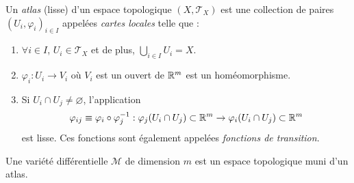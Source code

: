 \begin{theoremframe}
    \begin{defi}
        Un \textit{atlas} (lisse) d'un espace topologique $(X,\mathcal{T}_X)$ est une collection de paires $(U_i,\varphi_i)_{i\in I}$ appelées \emph{cartes locales} telle que :
        \begin{enumerate}[label=\roman*.]
            \item $\forall i\in I$, $U_i \in \mathcal{T}_X$ et de plus, $\bigcup_{i\in I} U_i = X$.
            \item $\varphi_i:U_i\to V_i$ où $V_i$ est un ouvert de $\mathbb{R}^m$ est un homéomorphisme.
            \item Si $U_i \cap U_j \neq \varnothing$, l'application 
            \begin{align}
                \varphi_{ij} \equiv \varphi_i \circ \varphi^{-1}_j:\varphi_j(U_i\cap U_j) \subset \mathbb{R}^m \to \varphi_i(U_i\cap U_j) \subset \mathbb{R}^m 
            \end{align}
            est lisse. Ces fonctions sont également appelées \emph{fonctions de transition}.
        \end{enumerate}
    \end{defi}
\end{theoremframe}
\begin{theoremframe}
    \begin{defi}
        Une variété différentielle $\mathcal{M}$ de dimension $m$ est un espace topologique muni d'un atlas.
    \end{defi}
\end{theoremframe}

